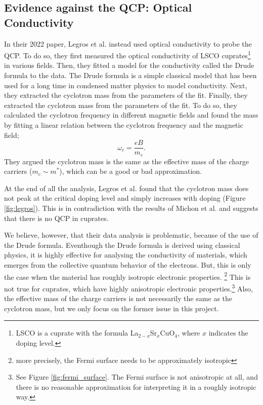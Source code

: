 \subsection{Evidence against the QCP: Optical Conductivity}
In their 2022 paper, Legros et al.\cite{legros2022} instead used optical conductivity to
probe the QCP. To do so, they first measured the optical conductivity of LSCO cuprates\footnote{
LSCO is a cuprate with the formula La$_{2-x}$Sr$_x$CuO$_4$, where $x$ indicates the doping level.}
in various fields. Then, they fitted a model for the conductivity called the Drude formula to the
data. The Drude formula is a simple classical model that has been used for a long time in condensed
matter physics to model conductivity. Next, they extracted the cyclotron mass from the parameters of
the fit. Finally, they extracted the cyclotron mass from the parameters of the fit. To do so, they
calculated the cyclotron frequency in different magnetic fields and found the mass by fitting a
linear relation between the cyclotron frequency and the magnetic field;
\begin{equation}
    \omega_c = \frac{eB}{m_c}.
\end{equation}
They argued the cyclotron mass is the same as the effective mass of the charge carriers
($m_c \sim m^*$), which can be a good or bad approximation.

At the end of all the analysis, Legros et al. found that the cyclotron mass does not peak
at the critical doping level and simply increases with doping (Figure \ref{fig:legros}). This is in contradiction with the
results of Michon et al. and suggests that there is no QCP in cuprates.

We believe, however, that their data analysis is problematic, because of the use of the Drude
formula. Eventhough the Drude formula is derived using classical physics, it is highly effective for
analysing the conductivity of materials, which emerges from the collective quantum behavior of the
electrons. But, this is only the case when the material has roughly isotropic electronic properties.
\footnote{more precisely, the Fermi surface needs to be approximately isotropic} This is not true
for cuprates, which have highly anisotropic electronic properties.\footnote{See Figure
\ref{fig:fermi_surface}. The Fermi surface is not anisotropic at all, and there is no reasonable
approximation for interpreting it in a roughly isotropic way.} Also, the effective mass of the
charge carriers is not necessarily the same as the cyclotron mass, but we only focus on the former
issue in this project.
